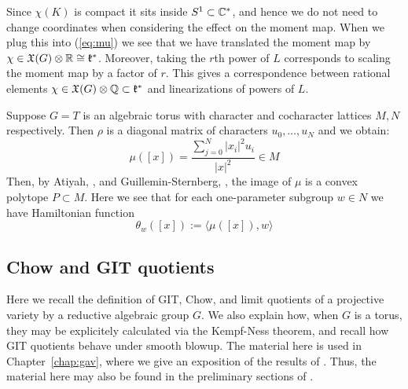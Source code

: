 Since \(\chi(K)\) is compact it sits inside \(S^1 \subset \mathbb{C}^*\), and hence we do not need to change coordinates when considering the effect on the moment map. When we plug this into (\ref{eq:mu}) we see that we have translated the moment map by \(\chi \in \mathfrak{X}(G) \otimes \mathbb{R} \cong \mathfrak{k}^*\). Moreover, taking the \(r\)th power of \(L\) corresponds to scaling the moment map by a factor of \(r\). This gives a correspondence between rational elements \(\chi \in \mathfrak{X}(G) \otimes \mathbb{Q} \subset \mathfrak{k}^*\) and linearizations of powers of \(L\).
\begin{example}
Suppose \(G = T\) is an algebraic torus with character and cocharacter lattices \(M,N\) respectively. Then \(\rho\) is a diagonal matrix of characters \(u_0,\dots,u_{N}\) and we obtain:
\[
\mu([x]) = \frac{\sum_{j=0}^N |x_i|^2 u_i}{|x|^2} \in M
\]
Then, by Atiyah, \cite{atiyah1982convexity}, and Guillemin-Sternberg, \cite{guillemin1982convexity}, the image of \(\mu\) is a convex polytope \(P \subset M\). Here we see that for each one-parameter subgroup \(w \in N\) we have Hamiltonian function
\[
\theta_w([x]) := \langle \mu([x]), w \rangle  
\]
\end{example}
\subsection{Chow and GIT quotients} \label{basics:Chowquotients}
Here we recall the definition of GIT, Chow, and limit quotients of a projective variety by a reductive algebraic group \(G\). We also explain how, when \(G\) is a torus, they may be explicitely calculated via the Kempf-Ness theorem, and recall how GIT quotients behave under smooth blowup. The material here is used in Chapter~\ref{chap:gav}, where we give an exposition of the results of \cite{cable2019general}. Thus, the material here may also be found in the preliminary sections of \cite{cable2019general}.
